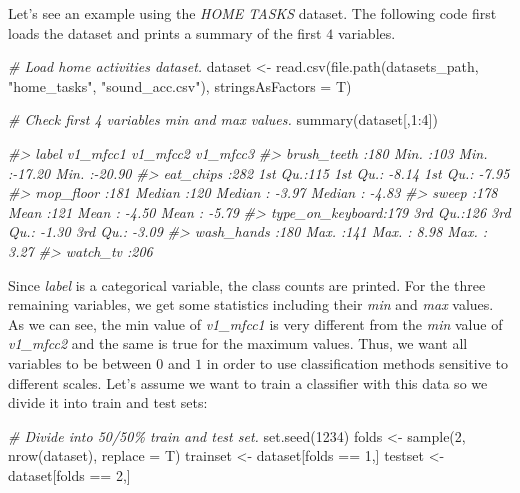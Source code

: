\documentclass[
  11pt,
]{krantz}
\newenvironment{Shaded}{\begin{snugshade}}{\end{snugshade}}
\newcommand{\AttributeTok}[1]{\textcolor[rgb]{0.61,0.61,0.61}{#1}}
\newcommand{\CommentTok}[1]{\textcolor[rgb]{0.37,0.37,0.37}{\textit{#1}}}
\newcommand{\DecValTok}[1]{\textcolor[rgb]{0.06,0.06,0.06}{#1}}
\newcommand{\FunctionTok}[1]{\textcolor[rgb]{0,0,0}{#1}}
\newcommand{\NormalTok}[1]{#1}
\newcommand{\OtherTok}[1]{\textcolor[rgb]{0.37,0.37,0.37}{#1}}
\newcommand{\SpecialCharTok}[1]{\textcolor[rgb]{0,0,0}{#1}}
\newcommand{\StringTok}[1]{\textcolor[rgb]{0.5,0.5,0.5}{#1}}
\begin{document}
Let's see an example using the \emph{HOME TASKS} dataset. The following code first loads the dataset and prints a summary of the first \(4\) variables.

\begin{Shaded}
\begin{Highlighting}[]
\CommentTok{\# Load home activities dataset.}
\NormalTok{dataset }\OtherTok{\textless{}{-}} \FunctionTok{read.csv}\NormalTok{(}\FunctionTok{file.path}\NormalTok{(datasets\_path,}
                              \StringTok{"home\_tasks"}\NormalTok{,}
                              \StringTok{"sound\_acc.csv"}\NormalTok{),}
                    \AttributeTok{stringsAsFactors =}\NormalTok{ T)}

\CommentTok{\# Check first 4 variables\textquotesingle{} min and max values.}
\FunctionTok{summary}\NormalTok{(dataset[,}\DecValTok{1}\SpecialCharTok{:}\DecValTok{4}\NormalTok{])}

\CommentTok{\#\textgreater{}                label        v1\_mfcc1      v1\_mfcc2         v1\_mfcc3     }
\CommentTok{\#\textgreater{} brush\_teeth     :180   Min.   :103   Min.   :{-}17.20   Min.   :{-}20.90  }
\CommentTok{\#\textgreater{} eat\_chips       :282   1st Qu.:115   1st Qu.: {-}8.14   1st Qu.: {-}7.95  }
\CommentTok{\#\textgreater{} mop\_floor       :181   Median :120   Median : {-}3.97   Median : {-}4.83  }
\CommentTok{\#\textgreater{} sweep           :178   Mean   :121   Mean   : {-}4.50   Mean   : {-}5.79  }
\CommentTok{\#\textgreater{} type\_on\_keyboard:179   3rd Qu.:126   3rd Qu.: {-}1.30   3rd Qu.: {-}3.09  }
\CommentTok{\#\textgreater{} wash\_hands      :180   Max.   :141   Max.   :  8.98   Max.   :  3.27  }
\CommentTok{\#\textgreater{} watch\_tv        :206    }
\end{Highlighting}
\end{Shaded}

Since \emph{label} is a categorical variable, the class counts are printed. For the three remaining variables, we get some statistics including their \emph{min} and \emph{max} values. As we can see, the min value of \emph{v1\_mfcc1} is very different from the \emph{min} value of \emph{v1\_mfcc2} and the same is true for the maximum values. Thus, we want all variables to be between \(0\) and \(1\) in order to use classification methods sensitive to different scales. Let's assume we want to train a classifier with this data so we divide it into train and test sets:

\begin{Shaded}
\begin{Highlighting}[]
\CommentTok{\# Divide into 50/50\% train and test set.}
\FunctionTok{set.seed}\NormalTok{(}\DecValTok{1234}\NormalTok{)}
\NormalTok{folds }\OtherTok{\textless{}{-}} \FunctionTok{sample}\NormalTok{(}\DecValTok{2}\NormalTok{, }\FunctionTok{nrow}\NormalTok{(dataset), }\AttributeTok{replace =}\NormalTok{ T)}
\NormalTok{trainset }\OtherTok{\textless{}{-}}\NormalTok{ dataset[folds }\SpecialCharTok{==} \DecValTok{1}\NormalTok{,]}
\NormalTok{testset }\OtherTok{\textless{}{-}}\NormalTok{ dataset[folds }\SpecialCharTok{==} \DecValTok{2}\NormalTok{,]}
\end{Highlighting}
\end{Shaded}
\end{document}
